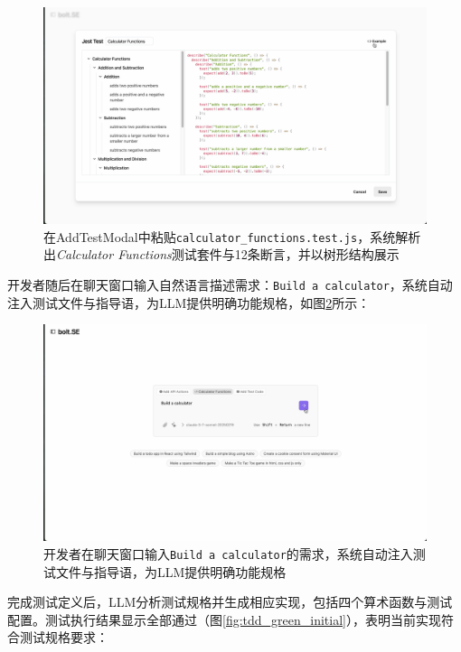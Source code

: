 \begin{figure}[H]
  \centering
  \includegraphics[width=.9\textwidth]{figures/screenshots/tdd/add_test_modal.png}
  \caption{在AddTestModal中粘贴\texttt{calculator\_functions.test.js}，系统解析出\textit{Calculator Functions}测试套件与12条断言，并以树形结构展示}
  \label{fig:tdd_add_test}
\end{figure}

开发者随后在聊天窗口输入自然语言描述需求：\texttt{Build a calculator}，系统自动注入测试文件与指导语，为LLM提供明确功能规格，如图\ref{fig:tdd_prompt}所示：

\begin{figure}[H]
  \centering
  \includegraphics[width=.9\textwidth]{figures/screenshots/tdd/calculator_prompt.png}
  \caption{开发者在聊天窗口输入\texttt{Build a calculator}的需求，系统自动注入测试文件与指导语，为LLM提供明确功能规格}
  \label{fig:tdd_prompt}
\end{figure}

完成测试定义后，LLM分析测试规格并生成相应实现，包括四个算术函数与测试配置。测试执行结果显示全部通过（图\ref{fig:tdd_green_initial}），表明当前实现符合测试规格要求：

